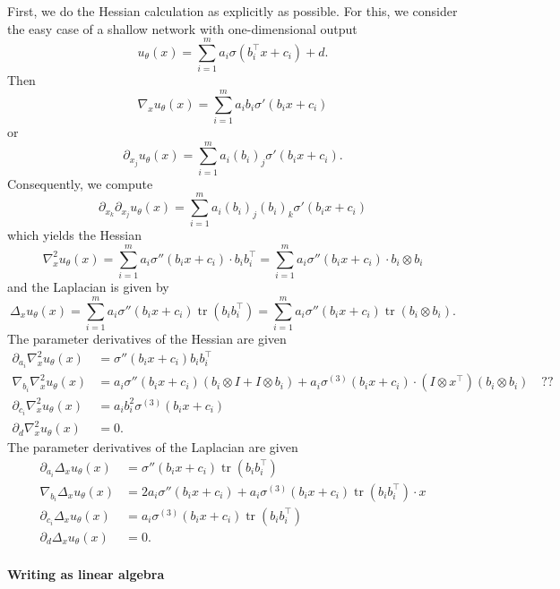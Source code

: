 \documentclass[11pt]{article}
\theoremstyle{definition}
\theoremstyle{plain}
\begin{document}
First, we do the Hessian calculation as explicitly as possible. For this, we consider the easy case of a shallow network with one-dimensional output
\[ u_\theta(x) = \sum_{i=1}^m a_i\sigma(b_i^\top x + c_i) + d. \]
Then 
\[ \nabla_x u_\theta(x) = \sum_{i=1}^m a_ib_i\sigma'(b_i x + c_i) \]
or 
\[ \partial_{x_j} u_\theta(x) = \sum_{i=1}^m a_i(b_i)_j\sigma'(b_i x + c_i). \]
Consequently, we compute 
\[ \partial_{x_k}\partial_{x_j} u_\theta(x) = \sum_{i=1}^m a_i(b_i)_j(b_i)_k\sigma'(b_i x + c_i) \]
which yields the Hessian
\[ \nabla^2_x u_\theta(x) = \sum_{i=1}^m a_i\sigma''(b_i x + c_i) \cdot b_ib_i^\top = \sum_{i=1}^m a_i\sigma''(b_i x + c_i) \cdot  b_i\otimes b_i \]
and the Laplacian is given by 
\[ \Delta_x u_\theta(x) = \sum_{i=1}^m a_i\sigma''(b_i x + c_i) \operatorname{tr}(b_ib_i^\top) = \sum_{i=1}^m a_i\sigma''(b_i x + c_i)  \operatorname{tr}(b_i\otimes b_i). \]
The parameter derivatives of the Hessian are given 
\begin{align*}
     \partial_{a_i}\nabla_x^2 u_\theta(x) & = \sigma''(b_i x + c_i) b_ib_i^\top \\
     \nabla_{b_i}\nabla_x^2 u_\theta(x) & = a_i\sigma''(b_i x + c_i) (b_i\otimes I+I\otimes b_i) + a_i \sigma^{(3)}(b_i x + c_i) \cdot  (I\otimes x^\top)(b_i\otimes b_i) \quad ?? \\
     \partial_{c_i}\nabla_x^2 u_\theta(x) & = a_i b_i^2\sigma^{(3)}(b_i x + c_i) \\
     \partial_{d}\nabla_x^2 u_\theta(x) & = 0.
\end{align*}
The parameter derivatives of the Laplacian are given 
\begin{align*}
     \partial_{a_i}\Delta_x u_\theta(x) & = \sigma''(b_i x + c_i) \operatorname{tr}(b_ib_i^\top) \\
     \nabla_{b_i}\Delta_x u_\theta(x) & = 2a_i\sigma''(b_i x + c_i) + a_i \sigma^{(3)}(b_i x + c_i) \operatorname{tr}(b_ib_i^\top) \cdot x \\
     \partial_{c_i}\Delta_x u_\theta(x) & = a_i \sigma^{(3)}(b_i x + c_i)\operatorname{tr}(b_ib_i^\top) \\
     \partial_{d}\Delta_x u_\theta(x) & = 0.
\end{align*}


\paragraph{Writing as linear algebra}
\end{document}

